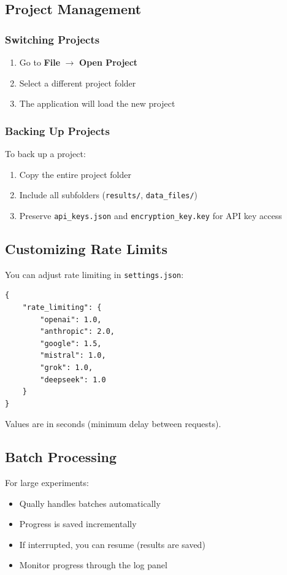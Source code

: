 \documentclass[11pt,a4paper]{article}
\begin{document}
\subsection{Project Management}
\subsubsection{Switching Projects}
\begin{enumerate}
    \item Go to \textbf{File} $\rightarrow$ \textbf{Open Project}
    \item Select a different project folder
    \item The application will load the new project
\end{enumerate}

\subsubsection{Backing Up Projects}
To back up a project:
\begin{enumerate}
    \item Copy the entire project folder
    \item Include all subfolders (\texttt{results/}, \texttt{data\_files/})
    \item Preserve \texttt{api\_keys.json} and \texttt{encryption\_key.key} for API key access
\end{enumerate}

\subsection{Customizing Rate Limits}
You can adjust rate limiting in \texttt{settings.json}:
\begin{lstlisting}[basicstyle=\ttfamily\small, showstringspaces=false]
{
    "rate_limiting": {
        "openai": 1.0,
        "anthropic": 2.0,
        "google": 1.5,
        "mistral": 1.0,
        "grok": 1.0,
        "deepseek": 1.0
    }
}
\end{lstlisting}

Values are in seconds (minimum delay between requests).

\subsection{Batch Processing}
For large experiments:
\begin{itemize}
    \item Qually handles batches automatically
    \item Progress is saved incrementally
    \item If interrupted, you can resume (results are saved)
    \item Monitor progress through the log panel
\end{itemize}
\end{document}
